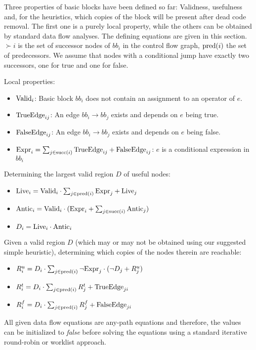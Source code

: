 \documentclass[halfparskip]{scrartcl}
\begin{document}
Three properties of basic blocks have been defined so far: Validness, usefulness and, for the heuristics, which copies of the block will be present after dead code removal. The first one is a purely local property, while the others can be obtained by standard data flow analyses. The defining equations are given in this section. $\succ{i}$ is the set of successor nodes of $bb_i$ in the control flow graph, $\operatorname{pred}(i)$ the set of predecessors. We assume that nodes with a conditional jump have exactly two successors, one for true and one for false.

Local properties:
\begin{itemize}
\item $\text{Valid}_i$: Basic block $bb_i$ does not contain an assignment to an operator of $e$.
\item $\text{TrueEdge}_{ij}$: An edge $bb_i \to bb_j$ exists and depends on $e$ being true.
\item $\text{FalseEdge}_{ij}$: An edge $bb_i \to bb_j$ exists and depends on $e$ being false.
\item $\text{Expr}_{i} = \sum_{j\in\operatorname{succ}(i)} \text{TrueEdge}_{ij} + \text{FalseEdge}_{ij}$: $e$ is a conditional expression in $bb_i$
\end{itemize}

Determining the largest valid region $D$ of useful nodes:
\begin{itemize}
\item $\text{Live}_i = \text{Valid}_i \cdot \sum_{j\in \operatorname{pred}(i)} \text{Expr}_j + \text{Live}_{j}$
\item $\text{Antic}_i = \text{Valid}_i \cdot (\text{Expr}_i + \sum_{j\in \operatorname{succ}(i)} \text{Antic}_j)$
\item $D_i = \text{Live}_i \cdot \text{Antic}_i$
\end{itemize}

Given a valid region $D$ (which may or may not be obtained using our suggested simple heuristic), determining which copies of the nodes therein are reachable:
\begin{itemize}
\item $R^u_i = D_i \cdot \sum_{j\in \operatorname{pred}(i)} \neg \text{Expr}_j\cdot(\neg D_j + R^u_j)$
\item $R^t_i = D_i \cdot \sum_{j\in \operatorname{pred}(i)} R^t_j + \text{TrueEdge}_{ji}$
\item $R^f_i = D_i \cdot \sum_{j\in \operatorname{pred}(i)} R^f_j + \text{FalseEdge}_{ji}$
\end{itemize}

All given data flow equations are any-path equations and therefore, the values can be initialized to \textit{false} before solving the equations using a standard iterative round-robin or worklist approach.
\end{document}
